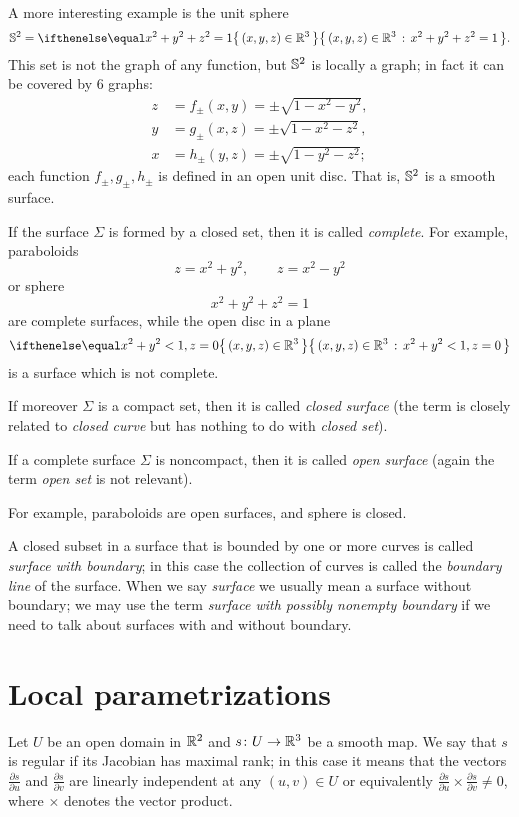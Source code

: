 A more interesting example is the unit sphere 
\[\SS^2=\set{(x,y,z)\in\RR^3}{x^2+y^2+z^2=1}.\]
This set is not the graph of any function,
but $\mathbb{S}^2$ is locally a graph;
in fact it can be covered by 6 graphs:
\begin{align*}
z&=f_\pm(x,y)=\pm \sqrt{1-x^2-y^2},
\\
y&=g_\pm(x,z)=\pm \sqrt{1-x^2-z^2},
\\
x&=h_\pm(y,z)=\pm \sqrt{1-y^2-z^2};
\end{align*}
each function $f_\pm,g_\pm,h_\pm$ is defined in an open unit disc.
That is, $\mathbb{S}^2$ is a smooth surface.

If the surface $\Sigma$ is formed by a closed set, then it is called \emph{complete}. %
For example, paraboloids %
\[z=x^2+y^2,\quad\quad z=x^2-y^2\]
or sphere 
\[x^2+y^2+z^2=1\]
are complete surfaces, while the
open disc in a plane 
\[\set{(x,y,z)\in\RR^3}{x^2+y^2<1, z=0}\]
is a surface which is not complete.

If moreover $\Sigma$ is a compact set, then it is called \emph{closed surface}
(the term is closely related to \emph{closed curve} but has nothing to do with \emph{closed set}).

If a complete surface $\Sigma$ is noncompact, then it is called  \emph{open surface} (again the term \emph{open set} is not relevant).

For example, paraboloids 
are open surfaces, 
and sphere is closed.

A closed subset in a surface that is bounded by one or more 
curves is called \emph{surface with boundary}; in this case the collection of curves is called the \emph{boundary line} of the surface.
When we say \emph{surface} we usually mean a surface without boundary;
we may use the term \emph{surface with possibly nonempty boundary} if we need to talk about surfaces with and without boundary.

\section*{Local parametrizations}

Let $U$ be an open domain in $\mathbb{R}^2$ and $s\colon U\to \mathbb{R}^3$ be a smooth map.
We say that $s$ is regular if its Jacobian has maximal rank;
in this case it means that the vectors $\tfrac{\partial s}{\partial u}$ and $\tfrac{\partial s}{\partial v}$ are linearly independent at any $(u,v)\in U$ or
equivalently $\tfrac{\partial s}{\partial u}\times\tfrac{\partial s}{\partial v}\ne 0$, where $\times$ denotes the vector product.

